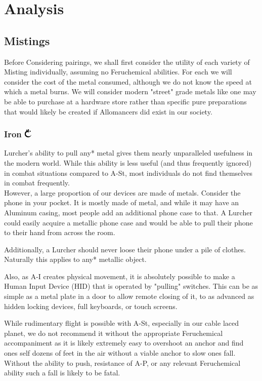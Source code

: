 \documentclass[conference]{IEEEtran}
\newcommand{\n}{\hfill\break}
\begin{document}
\section{\textbf{Analysis}}

\subsection{\textbf{Mistings}}\label{sec:mistings}
	Before Considering pairings, we shall first consider the utility of each variety of Misting individually, assuming no Feruchemical abilities.  For each we will consider the cost of the metal consumed, although we do not know the speed at which a metal burns.  We will consider modern "street" grade metals like one may be able to purchase at a hardware store rather than specific pure preparations that would likely be created if Allomancers did exist in our society.
    \subsubsection{\textbf{Iron}    \includegraphics[height=1em]{images/Iron.png}}\label{sec:mistings:iron}
    Lurcher's ability to pull any* metal gives them nearly unparalleled usefulness in the modern world.  While this ability is less useful (and thus frequently ignored) in combat situations compared to A-St, most individuals do not find themselves in combat frequently.  \\
    
    However, a large proportion of our devices are made of metals.  Consider the phone in your pocket.  It is mostly made of metal, and while it may have an Aluminum casing, most people add an additional phone case to that.  A Lurcher could easily acquire a metallic phone case and would be able to pull their phone to their hand from across the room.
    
    Additionally, a Lurcher should never loose their phone under a pile of clothes.  Naturally this applies to any* metallic object.\n
    
    Also, as A-I creates physical movement, it is absolutely possible to make a Human Input Device (HID) that is operated by "pulling" switches.  This can be as simple as a metal plate in a door to allow remote closing of it, to as advanced as hidden locking devices, full keyboards, or touch screens.\n
    
    While rudimentary flight is possible with A-St, especially in our cable laced planet, we do not recommend it without the appropriate Feruchemical accompaniment as it is likely extremely easy to overshoot an anchor and find ones self dozens of feet in the air without a viable anchor to slow ones fall.  Without the ability to push, resistance of A-P, or any relevant Feruchemical ability such a fall is likely to be fatal.\n
    
\end{document}
